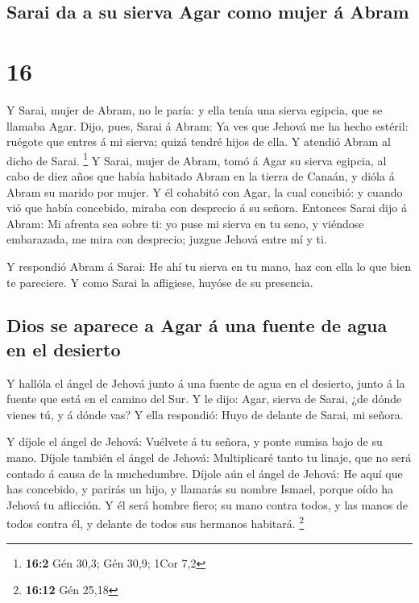 \hypertarget{sarai-da-a-su-sierva-agar-como-mujer-uxe1-abram}{%
\subsection{Sarai da a su sierva Agar como mujer á
Abram}\label{sarai-da-a-su-sierva-agar-como-mujer-uxe1-abram}}

\hypertarget{section-15}{%
\section{16}\label{section-15}}

 Y Sarai, mujer de Abram, no le paría: y ella tenía una
sierva egipcia, que se llamaba Agar.  Dijo, pues, Sarai á
Abram: Ya ves que Jehová me ha hecho estéril: ruégote que entres á mi
sierva; quizá tendré hijos de ella. Y atendió Abram al dicho de Sarai.
\footnote{\textbf{16:2} Gén 30,3; Gén 30,9; 1Cor 7,2}  Y
Sarai, mujer de Abram, tomó á Agar su sierva egipcia, al cabo de diez
años que había habitado Abram en la tierra de Canaán, y dióla á Abram su
marido por mujer.  Y él cohabitó con Agar, la cual
concibió: y cuando vió que había concebido, miraba con desprecio á su
señora.  Entonces Sarai dijo á Abram: Mi afrenta sea sobre
ti: yo puse mi sierva en tu seno, y viéndose embarazada, me mira con
desprecio; juzgue Jehová entre mí y ti.

 Y respondió Abram á Sarai: He ahí tu sierva en tu mano,
haz con ella lo que bien te pareciere. Y como Sarai la afligiese, huyóse
de su presencia.

\hypertarget{dios-se-aparece-a-agar-uxe1-una-fuente-de-agua-en-el-desierto}{%
\subsection{Dios se aparece a Agar á una fuente de agua en el
desierto}\label{dios-se-aparece-a-agar-uxe1-una-fuente-de-agua-en-el-desierto}}

 Y hallóla el ángel de Jehová junto á una fuente de agua
en el desierto, junto á la fuente que está en el camino del Sur.
 Y le dijo: Agar, sierva de Sarai, ¿de dónde vienes tú, y
á dónde vas? Y ella respondió: Huyo de delante de Sarai, mi señora.

 Y díjole el ángel de Jehová: Vuélvete á tu señora, y
ponte sumisa bajo de su mano.  Díjole también el ángel de
Jehová: Multiplicaré tanto tu linaje, que no será contado á causa de la
muchedumbre.  Díjole aún el ángel de Jehová: He aquí que
has concebido, y parirás un hijo, y llamarás su nombre Ismael, porque
oído ha Jehová tu aflicción.  Y él será hombre fiero; su
mano contra todos, y las manos de todos contra él, y delante de todos
sus hermanos habitará. \footnote{\textbf{16:12} Gén 25,18}

